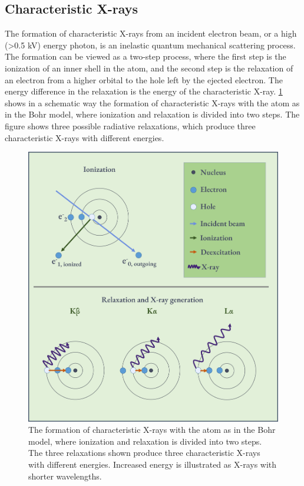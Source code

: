 \subsection{Characteristic X-rays}
\label{theory:xray_formation:characteristic}

The formation of characteristic X-rays from an incident electron beam, or a high (>0.5 kV) energy photon, is an inelastic quantum mechanical scattering process.
The formation can be viewed as a two-step process, where the first step is the ionization of an inner shell in the atom, and the second step is the relaxation of an electron from a higher orbital to the hole left by the ejected electron.
The energy difference in the relaxation is the energy of the characteristic X-ray.
\cref{fig:characteristic_xray_formation} shows in a schematic way the formation of characteristic X-rays with the atom as in the Bohr model, where ionization and relaxation is divided into two steps.
The figure shows three possible radiative relaxations, which produce three characteristic X-rays with different energies.


\begin{figure}[ht]
    \centering
    \includegraphics[width=0.7\linewidth]{figures/characteristic_xray_formation.png}
    \caption{
        The formation of characteristic X-rays with the atom as in the Bohr model, where ionization and relaxation is divided into two steps.
        The three relaxations shown produce three characteristic X-rays with different energies.
        Increased energy is illustrated as X-rays with shorter wavelengths.
    }
    \label{fig:characteristic_xray_formation}
\end{figure}


